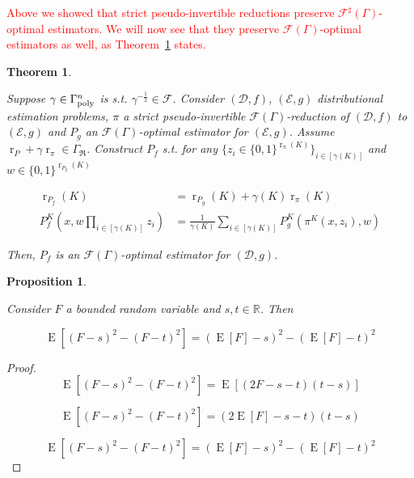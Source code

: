 \documentclass[11pt]{article}
\numberwithin{equation}{section}
\theoremstyle{definition}
\theoremstyle{plain}
\newtheorem{theorem}{Theorem}[section]
\newtheorem{proposition}{Proposition}[section]
\newcommand{\Bool}{\{0,1\}}
\DeclareMathOperator{\E}{E}
\DeclareMathOperator{\R}{r}
\newcommand{\Reals}{\mathbb{R}}
\newcommand{\Dist}{\mathcal{D}}
\newcommand{\GrowR}{\Gamma_{\mathfrak{R}}}
\newcommand{\Fall}{\mathcal{F}}
\newcommand{\EG}{\Fall(\Gamma)}
\newcommand{\ESG}{\Fall^\sharp(\Gamma)}
\newcommand{\BoolR}[1]{\Bool^{\R_{#1}(K)}}
\newcommand{\GammaPoly}{\Gamma_{\textnormal{poly}}}
\begin{document}
\begin{samepage}
\textcolor{red}{Above we showed that strict pseudo-invertible reductions preserve $\ESG$-optimal estimators. We will now see that they preserve $\EG$-optimal estimators as well, as Theorem~\ref{thm:sp_reduce} states.}
\begin{theorem}
\label{thm:sp_reduce}

Suppose $\gamma \in \GammaPoly^n$ is s.t. $\gamma^{-\frac{1}{2}} \in \Fall$. Consider $(\Dist,f)$, $(\mathcal{E},g)$ distributional estimation problems, $\pi$ a strict pseudo-invertible $\EG$-reduction of $(\Dist, f)$ to $(\mathcal{E}, g)$ and $P_g$ an $\EG$-optimal estimator for $(\mathcal{E}, g)$. Assume $\R_P + \gamma \R_\pi \in \GrowR$. Construct ${P_f}$  s.t. for any ${\{z_i \in \BoolR{\pi}\}_{i \in [\gamma(K)]}}$ and ${w \in \BoolR{P_g}}$

\begin{align}
\label{eqn:thm__sp_reduce__rpf}\R_{P_f}(K) &= \R_{P_g}(K) + \gamma(K) \R_\pi(K) \\
\label{eqn:thm__sp_reduce__pf}P_f^K\left(x, w \prod_{i \in [\gamma(K)]} z_i\right) &= \frac{1}{\gamma(K)}\sum_{i \in [\gamma(K)]} P_g^K(\pi^K(x,z_i),w)
\end{align}


Then, $P_f$ is an $\EG$-optimal estimator for ${(\Dist,g)}$.

\end{theorem}
\end{samepage}

\begin{samepage}
\begin{proposition}
\label{prp:ev_diff_sq}

Consider ${F}$ a bounded random variable and ${s,t \in \Reals}$. Then

\begin{equation}
\E[(F - s)^2 - (F - t)^2] = (\E[F] - s)^2 - (\E[F] - t)^2
\end{equation}

\end{proposition}
\end{samepage}

\begin{proof}

\[\E[(F - s)^2 - (F - t)^2] = \E[(2F - s - t)(t-s)]\]

\[\E[(F - s)^2 - (F - t)^2] = (2\E[F] - s - t)(t-s)\]

\[\E[(F - s)^2 - (F - t)^2] = (\E[F] - s)^2 - (\E[F] - t)^2\]
%
\end{proof}
\end{document}
